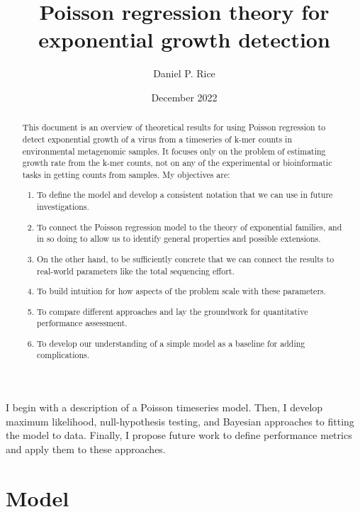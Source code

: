 \documentclass[12pt, letterpaper]{article}
\title{Poisson regression theory for exponential growth detection}
\author{Daniel P. Rice}
\date{December 2022}
\begin{document}
\maketitle

\begin{abstract}
    This document is an overview of theoretical results for using Poisson regression to detect exponential growth of a virus from a timeseries of k-mer counts in environmental metagenomic samples.
    It focuses only on the problem of estimating growth rate from the k-mer counts, not on any of the experimental or bioinformatic tasks in getting counts from samples.
    My objectives are:
    \begin{enumerate}
        \item To define the model and develop a consistent notation that we can use in future investigations.
        \item To connect the Poisson regression model to the theory of exponential families, and in so doing to allow us to identify general properties and possible extensions.
        \item On the other hand, to be sufficiently concrete that we can connect the results to real-world parameters like the total sequencing effort.
        \item To build intuition for how aspects of the problem scale with these parameters.
        \item To compare different approaches and lay the groundwork for quantitative performance assessment.
        \item To develop our understanding of a simple model as a baseline for adding complications.
    \end{enumerate}
\end{abstract}
I begin with a description of a Poisson timeseries model.
Then, I develop maximum likelihood, null-hypothesis testing, and Bayesian approaches to fitting the model to data.
Finally, I propose future work to define performance metrics and apply them to these approaches.

\tableofcontents

\section{Model}
\end{document}
